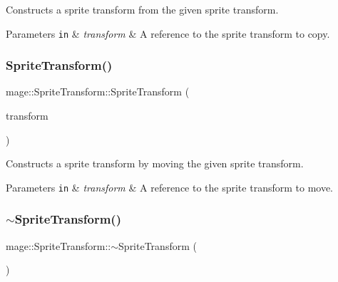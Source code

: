 Constructs a sprite transform from the given sprite transform.


\begin{DoxyParams}[1]{Parameters}
\mbox{\tt in}  & {\em transform} & A reference to the sprite transform to copy. \\
\hline
\end{DoxyParams}
\hypertarget{structmage_1_1_sprite_transform_a53d7da4498f4f9f67be2994eb4593c3a}{}\label{structmage_1_1_sprite_transform_a53d7da4498f4f9f67be2994eb4593c3a} 
\subsubsection{\texorpdfstring{Sprite\+Transform()}{SpriteTransform()}\hspace{0.1cm}{\footnotesize\ttfamily [4/4]}}
{\footnotesize\ttfamily mage\+::\+Sprite\+Transform\+::\+Sprite\+Transform (\begin{DoxyParamCaption}\item[{\hyperlink{structmage_1_1_sprite_transform}{Sprite\+Transform} \&\&}]{transform }\end{DoxyParamCaption})\hspace{0.3cm}{\ttfamily [default]}}

Constructs a sprite transform by moving the given sprite transform.


\begin{DoxyParams}[1]{Parameters}
\mbox{\tt in}  & {\em transform} & A reference to the sprite transform to move. \\
\hline
\end{DoxyParams}
\hypertarget{structmage_1_1_sprite_transform_a14a3614023996cbb071c3de99f9528bc}{}\label{structmage_1_1_sprite_transform_a14a3614023996cbb071c3de99f9528bc} 
\subsubsection{\texorpdfstring{$\sim$\+Sprite\+Transform()}{~SpriteTransform()}}
{\footnotesize\ttfamily mage\+::\+Sprite\+Transform\+::$\sim$\+Sprite\+Transform (\begin{DoxyParamCaption}{ }\end{DoxyParamCaption})\hspace{0.3cm}{\ttfamily [default]}}

